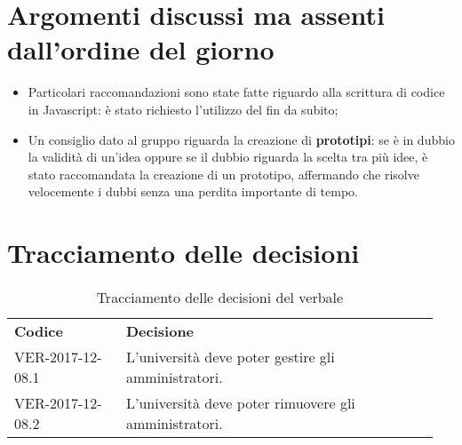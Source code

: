 \documentclass[VER-2017-12-08.tex]{subfiles}
\begin{document}
\section{Argomenti discussi ma assenti dall'ordine del giorno}
\begin{itemize}
	\item Particolari raccomandazioni sono state fatte riguardo alla scrittura di codice in Javascript: è stato richiesto l'utilizzo del  fin da subito;
	
	\item Un consiglio dato al gruppo riguarda la creazione di \textbf{prototipi}: se è in dubbio la validità di un'idea oppure se il dubbio riguarda la scelta tra più idee, è stato raccomandata la creazione di un prototipo, affermando che risolve velocemente i dubbi senza una perdita importante di tempo.
\end{itemize}
\section{Tracciamento delle decisioni}
\begin{table}[H]
	\begin{center}
		\begin{tabu} to 
			\tableHeaderStyle
			\textbf{Codice} & \textbf{Decisione} \\
			VER-2017-12-08.1 & L'università deve poter gestire gli amministratori. \\
			VER-2017-12-08.2 & L'università deve poter rimuovere gli amministratori. \\
		\end{tabu}
	\caption{Tracciamento delle decisioni del verbale}
	\end{center}
\end{table}
\end{document}
